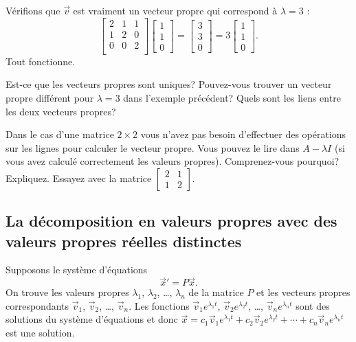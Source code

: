 \begin{example}
Vérifions que $\vec{v}$ est vraiment un vecteur propre qui correspond à $\lambda = 3$ :
\begin{equation*}
\begin{bmatrix}
2 & 1 & 1 \\
1 & 2 & 0 \\
0 & 0 & 2 \\
\end{bmatrix}
\begin{bmatrix}
1 \\
1 \\
0
\end{bmatrix}
=
\begin{bmatrix}
3 \\
3 \\
0
\end{bmatrix}
=
3
\begin{bmatrix}
1 \\
1 \\
0
\end{bmatrix} .
\end{equation*}
Tout fonctionne.
\end{example}

\begin{exercise}[facile]
Est-ce que les vecteurs propres sont uniques? Pouvez-vous trouver un vecteur propre différent pour $\lambda = 3$ dans l’exemple précédent? Quels sont les liens entre les deux vecteurs propres?
\end{exercise}

\begin{exercise}
Dans le cas d’une matrice $2 \times 2$ vous n’avez pas besoin d'effectuer des opérations sur les lignes pour calculer le vecteur propre. Vous pouvez le lire dans $A-\lambda I$
(si vous avez calculé correctement les valeurs propres). Comprenez-vous pourquoi? Expliquez. Essayez avec la matrice
$\left[ \begin{smallmatrix} 2 & 1 \\ 1 & 2 \end{smallmatrix} \right]$.
\end{exercise}

\subsection{La décomposition en valeurs propres avec des valeurs propres réelles distinctes}

Supposons le système d’équations
\begin{equation*}
{\vec{x}}' = P\vec{x} .
\end{equation*}
On trouve les valeurs propres $\lambda_1$, $\lambda_2$, \ldots, $\lambda_n$
de la matrice $P$ et les vecteurs propres correspondants
$\vec{v}_1$, $\vec{v}_2$, \ldots, $\vec{v}_n$.
Les fonctions
$\vec{v}_1 e^{\lambda_1 t}$, 
$\vec{v}_2 e^{\lambda_2 t}$, \ldots,
$\vec{v}_n e^{\lambda_n t}$ sont des solutions du système d'équations et donc
$
\vec{x} = c_1 \vec{v}_1 e^{\lambda_1 t} +
c_2 \vec{v}_2 e^{\lambda_2 t} + \cdots +
c_n \vec{v}_n e^{\lambda_n t}
$
est une solution.

